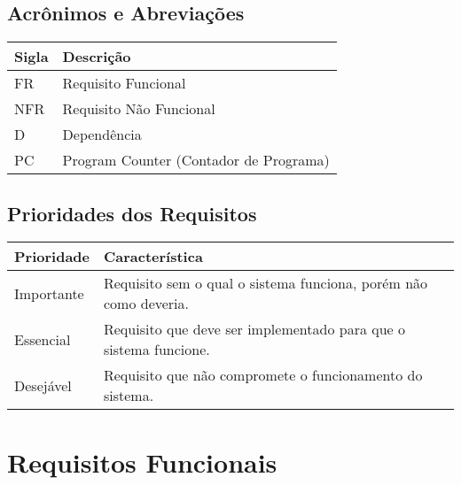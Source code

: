 \documentclass{article}
\begin{document}
  \subsection{Acrônimos e Abreviações}
    \FloatBarrier
    \begin{table}[H]
      \begin{center}
        \begin{tabular}[pos]{|m{2cm} | m{12cm}|}
          \hline
          \cellcolor[gray]{0.9}\textbf{Sigla} & \cellcolor[gray]{0.9}\textbf{Descrição} \\ \hline
          FR      & Requisito Funcional  \\ \hline
          NFR     & Requisito Não Funcional  \\ \hline
          D       & Dependência  \\ \hline
          PC       & Program Counter (Contador de Programa)  \\ \hline
        \end{tabular}
      \end{center}
    \end{table}

  \subsection{Prioridades dos Requisitos}
    \FloatBarrier
    \begin{table}[H]
      \begin{center}
        \begin{tabular}[pos]{|m{2cm} | m{12cm}|}
          \hline
          \cellcolor[gray]{0.9}\textbf{Prioridade} & \cellcolor[gray]{0.9}\textbf{Característica} \\ \hline
          Importante      & Requisito sem o qual o sistema funciona, porém não como deveria.  \\ \hline
          Essencial       & Requisito que deve ser implementado para que o sistema funcione.  \\ \hline
          Desejável       & Requisito que não compromete o funcionamento do sistema.  \\ \hline
        \end{tabular}
      \end{center}
    \end{table}

  \section{Requisitos Funcionais}
\end{document}
